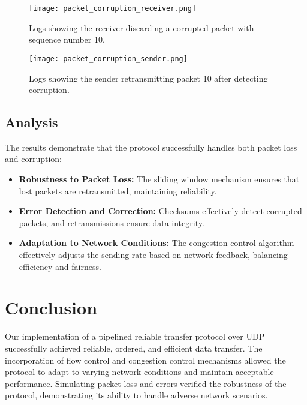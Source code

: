 \documentclass[11pt]{article}
\begin{document}
\begin{figure}[H]
    \centering
    \texttt{[image: packet\_corruption\_receiver.png]}
    \caption{Logs showing the receiver discarding a corrupted packet with sequence number 10.}
    \label{fig:packet_corruption_receiver}
\end{figure}
\begin{figure}[H]
    \centering
    \texttt{[image: packet\_corruption\_sender.png]}
    \caption{Logs showing the sender retransmitting packet 10 after detecting corruption.}
    \label{fig:packet_corruption_sender}
\end{figure}

\subsection{Analysis}

The results demonstrate that the protocol successfully handles both packet loss and corruption:

\begin{itemize}
    \item \textbf{Robustness to Packet Loss:} The sliding window mechanism ensures that lost packets are retransmitted, maintaining reliability.
    \item \textbf{Error Detection and Correction:} Checksums effectively detect corrupted packets, and retransmissions ensure data integrity.
    \item \textbf{Adaptation to Network Conditions:} The congestion control algorithm effectively adjusts the sending rate based on network feedback, balancing efficiency and fairness.
\end{itemize}

\section{Conclusion}

Our implementation of a pipelined reliable transfer protocol over UDP successfully achieved reliable, ordered, and efficient data transfer. The incorporation of flow control and congestion control mechanisms allowed the protocol to adapt to varying network conditions and maintain acceptable performance. Simulating packet loss and errors verified the robustness of the protocol, demonstrating its ability to handle adverse network scenarios.
\end{document}
